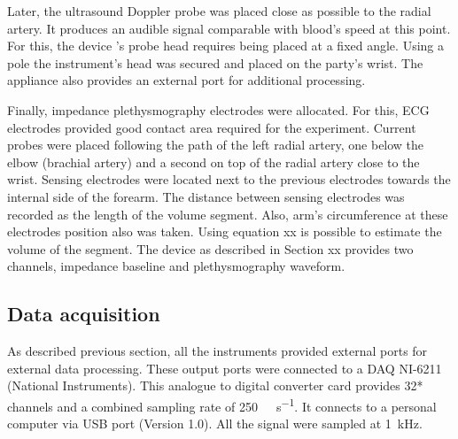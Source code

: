 

Later, the ultrasound Doppler probe was placed close as possible to the radial artery. It produces an audible signal comparable with blood's speed at this point. For this, the device 's probe head requires being placed at a fixed angle. Using a pole the instrument's head was secured and placed on the party's wrist. The appliance also provides an external port for additional processing.  



Finally, impedance plethysmography electrodes were allocated. For this, ECG electrodes provided good contact area required for the experiment. Current probes were placed following the path of the left radial artery, one below the elbow (brachial artery) and a second on top of the radial artery close to the wrist. Sensing electrodes were located next to the previous electrodes towards the internal side of the forearm. The distance between sensing electrodes was recorded as the length of the volume segment. Also, arm's circumference at these electrodes position also was taken. Using equation xx is possible to estimate the volume of the segment.  The device as described in Section xx provides two channels, impedance baseline and plethysmography waveform. 



\subsection{Data acquisition}
\label{section4.1.2}

As described previous section, all the instruments provided external ports for external data processing. These output ports were connected to a DAQ NI-6211 (National Instruments). This analogue to digital converter card provides 32* channels and a combined sampling rate of \SI{250}{\kilo\sample\per\second}. It connects to a personal computer via USB port (Version 1.0). All the signal were sampled at \SI{1}{\kilo\hertz}.

